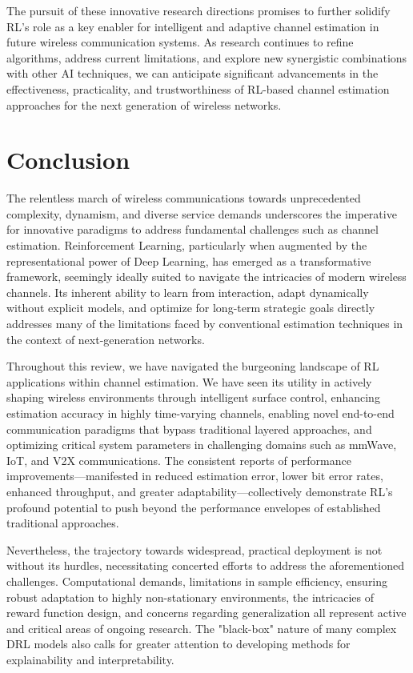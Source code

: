 \documentclass[journal,twocolumn]{IEEEtran}
\begin{document}
The pursuit of these innovative research directions promises to further solidify RL's role as a key enabler for intelligent and adaptive channel estimation in future wireless communication systems. As research continues to refine algorithms, address current limitations, and explore new synergistic combinations with other AI techniques, we can anticipate significant advancements in the effectiveness, practicality, and trustworthiness of RL-based channel estimation approaches for the next generation of wireless networks.

\section{Conclusion}

The relentless march of wireless communications towards unprecedented complexity, dynamism, and diverse service demands underscores the imperative for innovative paradigms to address fundamental challenges such as channel estimation. Reinforcement Learning, particularly when augmented by the representational power of Deep Learning, has emerged as a transformative framework, seemingly ideally suited to navigate the intricacies of modern wireless channels. Its inherent ability to learn from interaction, adapt dynamically without explicit models, and optimize for long-term strategic goals directly addresses many of the limitations faced by conventional estimation techniques in the context of next-generation networks.

Throughout this review, we have navigated the burgeoning landscape of RL applications within channel estimation. We have seen its utility in actively shaping wireless environments through intelligent surface control, enhancing estimation accuracy in highly time-varying channels, enabling novel end-to-end communication paradigms that bypass traditional layered approaches, and optimizing critical system parameters in challenging domains such as mmWave, IoT, and V2X communications. The consistent reports of performance improvements—manifested in reduced estimation error, lower bit error rates, enhanced throughput, and greater adaptability—collectively demonstrate RL's profound potential to push beyond the performance envelopes of established traditional approaches.

Nevertheless, the trajectory towards widespread, practical deployment is not without its hurdles, necessitating concerted efforts to address the aforementioned challenges. Computational demands, limitations in sample efficiency, ensuring robust adaptation to highly non-stationary environments, the intricacies of reward function design, and concerns regarding generalization all represent active and critical areas of ongoing research. The "black-box" nature of many complex DRL models also calls for greater attention to developing methods for explainability and interpretability.
\end{document}
